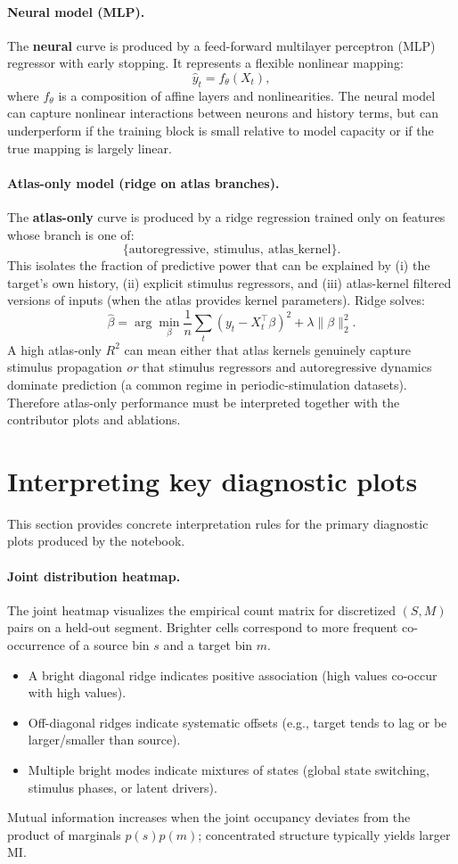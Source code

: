 \documentclass[11pt]{article}
\begin{document}
\paragraph{Neural model (MLP).}
The \textbf{neural} curve is produced by a feed-forward multilayer perceptron (MLP) regressor with early stopping. It represents a flexible nonlinear mapping:
\[
\hat{y}_t = f_\theta(X_t),
\]
where $f_\theta$ is a composition of affine layers and nonlinearities. The neural model can capture nonlinear interactions between neurons and history terms, but can underperform if the training block is small relative to model capacity or if the true mapping is largely linear.

\paragraph{Atlas-only model (ridge on atlas branches).}
The \textbf{atlas-only} curve is produced by a ridge regression trained only on features whose branch is one of:
\[
\{\text{autoregressive},\ \text{stimulus},\ \text{atlas\_kernel}\}.
\]
This isolates the fraction of predictive power that can be explained by (i) the target's own history, (ii) explicit stimulus regressors, and (iii) atlas-kernel filtered versions of inputs (when the atlas provides kernel parameters). Ridge solves:
\[
\hat{\beta}=\arg\min_{\beta}\frac{1}{n}\sum_{t}(y_t-X_t^\top\beta)^2+\lambda\|\beta\|_2^2.
\]
A high atlas-only $R^2$ can mean either that atlas kernels genuinely capture stimulus propagation \emph{or} that stimulus regressors and autoregressive dynamics dominate prediction (a common regime in periodic-stimulation datasets). Therefore atlas-only performance must be interpreted together with the contributor plots and ablations.

\section{Interpreting key diagnostic plots}
This section provides concrete interpretation rules for the primary diagnostic plots produced by the notebook.

\paragraph{Joint distribution heatmap.}
The joint heatmap visualizes the empirical count matrix for discretized $(S,M)$ pairs on a held-out segment. Brighter cells correspond to more frequent co-occurrence of a source bin $s$ and a target bin $m$. 
\begin{itemize}
\item A bright diagonal ridge indicates positive association (high values co-occur with high values).
\item Off-diagonal ridges indicate systematic offsets (e.g., target tends to lag or be larger/smaller than source).
\item Multiple bright modes indicate mixtures of states (global state switching, stimulus phases, or latent drivers).
\end{itemize}
Mutual information increases when the joint occupancy deviates from the product of marginals $p(s)p(m)$; concentrated structure typically yields larger MI.
\end{document}
